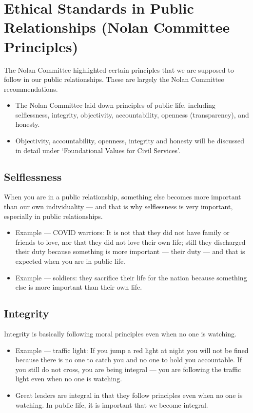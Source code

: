 \section{Ethical Standards in Public Relationships (Nolan Committee Principles)}

The Nolan Committee highlighted certain principles that we are supposed to follow in our public relationships. These are largely the Nolan Committee recommendations.

\begin{GovtPolicy}
\begin{itemize}
\item The Nolan Committee laid down principles of public life, including selflessness, integrity, objectivity, accountability, openness (transparency), and honesty.
\item Objectivity, accountability, openness, integrity and honesty will be discussed in detail under `Foundational Values for Civil Services'.
\end{itemize}
\end{GovtPolicy}

\subsection{Selflessness}

When you are in a public relationship, something else becomes more important than our own individuality --- and that is why selflessness is very important, especially in public relationships.

\begin{itemize}
\item Example --- COVID warriors: It is not that they did not have family or friends to love, nor that they did not love their own life; still they discharged their duty because something is more important --- their duty --- and that is expected when you are in public life.
\item Example --- soldiers: they sacrifice their life for the nation because something else is more important than their own life.
\end{itemize}

\subsection{Integrity}

Integrity is basically following moral principles even when no one is watching.

\begin{itemize}
\item Example --- traffic light: If you jump a red light at night you will not be fined because there is no one to catch you and no one to hold you accountable. If you still do not cross, you are being integral --- you are following the traffic light even when no one is watching.
\item Great leaders are integral in that they follow principles even when no one is watching. In public life, it is important that we become integral.
\end{itemize}

